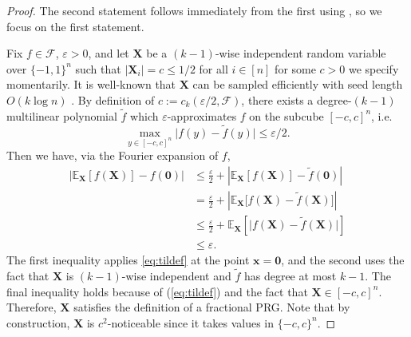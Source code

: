 \documentclass[10pt,a4paper]{article}
\newcommand{\eps}{\varepsilon}
\theoremstyle{definition}
\begin{document}
\begin{proof}
The second statement follows immediately from the first using , so we focus on the first statement.

Fix $f\in \mathcal{F}$, $\eps>0$, and let $\mathbf{X}$ be a $(k-1)$-wise independent random variable over $\{-1,1\}^n$ such that $\vert \mathbf{X}_i\vert=c \leq 1/2$ for all $i \in [n]$ for some $c>0$ we specify momentarily. It is well-known that $\mathbf{X}$ can be sampled efficiently with seed length $O(k\log n)$ \cite{vadhan2012pseudorandomness}. By definition of $c:=c_k(\eps/2,\mathcal{F})$, there exists a degree-$(k-1)$ multilinear polynomial $\widetilde{f}$ which $\eps$-approximates $f$ on the subcube $[-c,c]^n$, i.e.
\begin{equation}
\label{eq:tildef}
            \max_{ y \in [-c,c]^n } \bigl| f(y) - \widetilde{f}(y) \bigr| \leq \eps/2.
\end{equation}
Then we have, via the Fourier expansion of $f$,
\begin{align*}
    \bigl| \mathbb{E}_{\mathbf{X}}[f(\mathbf{X})]-f(\mathbf{0})\bigr|
    &\leq \frac{\eps}{2} + \left\vert \mathbb{E}_{\mathbf{X}}[f(\mathbf{X})]-\widetilde{f}(\mathbf{0})\right\vert\\
    &=\frac{\eps}{2} + \left\vert \mathbb{E}_{\mathbf{X}}\bigl[f(\mathbf{X})-\widetilde{f}(\mathbf{\mathbf{X}})\bigr]\right\vert\\
    &\leq \frac{\eps}{2} +  \mathbb{E}_{\mathbf{X}}\left[ \bigl| f(\mathbf{X})-\widetilde{f}(\mathbf{\mathbf{X}})\bigr| \right]\\
    &\leq \eps.
\end{align*}
The first inequality applies \cref{eq:tildef} at the point $\mathbf{x}=\mathbf{0}$, and the second uses the fact that $\mathbf{X}$ is $(k-1)$-wise independent and $\widetilde{f}$ has degree at most $k-1$. The final inequality holds because of (\ref{eq:tildef}) and the fact that $\mathbf{X}\in [-c,c]^n$.  Therefore, $\mathbf{X}$ satisfies the definition of a fractional PRG.  Note that by construction, $\mathbf{X}$ is $c^2$-noticeable since it takes values in $\{-c,c\}^n$.
\end{proof}
\end{document}
